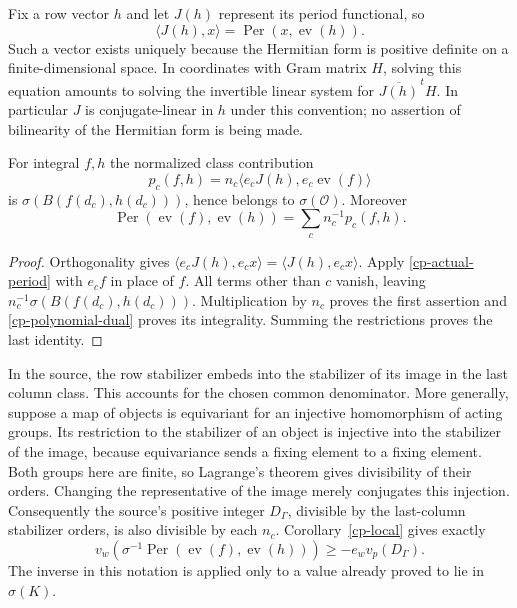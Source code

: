 Fix a row vector $h$ and let $J(h)$ represent its period
functional, so
\[
       \langle J(h),x\rangle=\operatorname{Per}(x,\operatorname{ev}(h)).
\]
Such a vector exists uniquely because the Hermitian form is
positive definite on a finite-dimensional space. In coordinates
with Gram matrix $H$, solving this equation amounts to solving
the invertible linear system for $\overline{J(h)}^{\,t}H$.
In particular $J$ is conjugate-linear in $h$ under this
convention; no assertion of bilinearity of the Hermitian form
is being made.

\begin{proposition}\label{cp-class-contribution}
For integral $f,h$ the normalized class contribution
\[
                p_c(f,h)=n_c\langle e_cJ(h),e_c\operatorname{ev}(f)\rangle
\]
is $\sigma(B(f(d_c),h(d_c)))$, hence belongs to
$\sigma(\mathcal O)$. Moreover
\[
              \operatorname{Per}(\operatorname{ev}(f),\operatorname{ev}(h))
                           =\sum_c n_c^{-1}p_c(f,h).
\]
\end{proposition}
\begin{proof}
Orthogonality gives
$\langle e_cJ(h),e_cx\rangle=\langle J(h),e_cx\rangle$.
Apply \eqref{cp-actual-period} with $e_cf$ in place of $f$.
All terms other than $c$ vanish, leaving
$n_c^{-1}\sigma(B(f(d_c),h(d_c)))$. Multiplication by $n_c$
proves the first assertion and \eqref{cp-polynomial-dual}
proves its integrality. Summing the restrictions proves
the last identity.
\end{proof}

In the source, the row stabilizer embeds into the stabilizer
of its image in the last column class. This accounts for the
chosen common denominator. More generally, suppose a map
of objects is equivariant for an injective homomorphism of
acting groups. Its restriction to the stabilizer of an object
is injective into the stabilizer of the image, because
equivariance sends a fixing element to a fixing element.
Both groups here are finite, so Lagrange's theorem gives
divisibility of their orders. Changing the representative
of the image merely conjugates this injection.
Consequently the source's positive integer $D_\Gamma$,
divisible by the last-column stabilizer orders, is also
divisible by each $n_c$. Corollary~\ref{cp-local} gives
exactly
\begin{equation}\label{cp-source-bound}
 v_w\!\left(\sigma^{-1}\operatorname{Per}
                (\operatorname{ev}(f),\operatorname{ev}(h))\right)
                      \ge -e_wv_p(D_\Gamma).
\end{equation}
The inverse in this notation is applied only to a value
already proved to lie in $\sigma(K)$.


